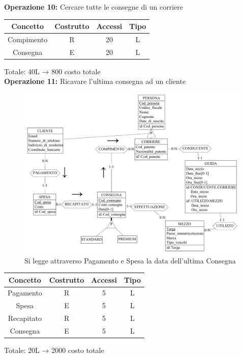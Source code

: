 \documentclass[a4paper,12pt]{report}
\begin{document}
\textbf{Operazione 10:}
Cercare tutte le consegne di un corriere\\
\begin{center}
    \begin{tabular}{ | c   c   c   c | } 
    \hline
	Concetto&Costrutto&Accessi&Tipo\\
	\hline
	Compimento&R&20&L\\
	\hline
    Consegna&E&20&L\\
	\hline
	\end{tabular}
\end{center}
Totale: 40L → 800 costo totale\\
\textbf{Operazione 11:}
Ricavare l'ultima consegna ad un cliente\\
\begin{figure}[H]
	\centering{}
	\includegraphics[width=\textwidth]{img/Operazione5.pdf}
	\caption{Si legge attraverso Pagamento e Spesa la data dell'ultima Consegna}
\end{figure}
\begin{center}
    \begin{tabular}{ | c   c   c   c | } 
    \hline
	Concetto&Costrutto&Accessi&Tipo\\
	\hline
	Pagamento&R&5&L\\
	\hline
    Spesa&E&5&L\\
	\hline
	Recapitato&R&5&L\\
	\hline
	Consegna&E&5&L\\
	\hline
	\end{tabular}
\end{center}
Totale: 20L → 2000 costo totale\\
\end{document}
